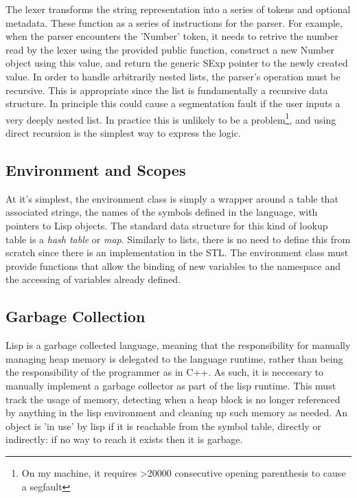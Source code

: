 \documentclass[12pt]{article}
\begin{document}
The lexer transforms the string representation into a series of tokens and optional metadata. These function as a series of instructions for the parser. For example, 
when the parser encounters the 'Number' token, it needs to retrive the number read by the lexer using the provided public function, construct a new 
Number object using this value, and return the generic SExp pointer to the newly created value. 
In order to handle arbitrarily nested lists, the parser's operation must be recursive. This is appropriate since the list is fundamentally a recursive data structure. In principle this could cause a segmentation fault if the user inputs a very deeply nested list. In practice this is unlikely to be a problem\footnote{On my machine, it requires 
>20000 consecutive opening parenthesis to cause a segfault}, and using direct recursion is the simplest way to express the logic. 

\subsection{Environment and Scopes} 
At it's simplest, the environment class is simply a wrapper around a table that associated strings, the names of the symbols defined in the language, with pointers
to Lisp objects. The standard data structure for this kind of lookup table is a \textit{hash table} or \textit{map}. Similarly to lists, there is no need to define this 
from scratch since there is an implementation in the STL. The environment class must provide functions that allow the 
binding of new variables to the namespace and the accessing of variables already defined. 

\subsection{Garbage Collection} 

Lisp is a garbage collected language, meaning that the responsibility for manually managing heap memory is delegated to the language runtime, rather than 
being the responsibility of the programmer as in C++. As such, it is neccesary to manually implement a garbage collector as part of the lisp runtime. This must 
track the usage of memory, detecting when a heap block is no longer referenced by anything in the lisp environment and cleaning up such memory as needed. 
An object is 'in use' by lisp if it is reachable from the symbol table, directly or indirectly: if no way to reach it exists then it is garbage. 
\end{document}

